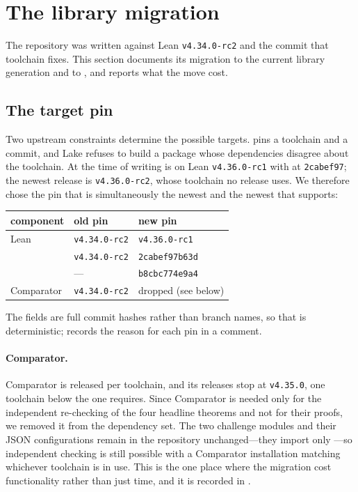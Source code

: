 \section{The library migration}
\label{sec:libraries}

The repository was written against Lean \texttt{v4.34.0-rc2} and the \Mathlib{} commit that
toolchain fixes. This section documents its migration to the current library generation and
to \TauCeti{}, and reports what the move cost.

\subsection{The target pin}
\label{sec:pin}

Two upstream constraints determine the possible targets. \TauCeti{} pins a toolchain and a
\Mathlib{} commit, and Lake refuses to build a package whose dependencies disagree about the
toolchain. At the time of writing \TauCeti{} is on Lean \texttt{v4.36.0-rc1} with \Mathlib{}
at \texttt{2cabef97}; the newest \Mathlib{} release is \texttt{v4.36.0-rc2}, whose toolchain
no \TauCeti{} release uses. We therefore chose the pin that is simultaneously the newest
\TauCeti{} and the newest \Mathlib{} that \TauCeti{} supports:
\begin{center}
\begin{tabular}{@{}lll@{}}
\toprule
component & old pin & new pin \\
\midrule
Lean & \texttt{v4.34.0-rc2} & \texttt{v4.36.0-rc1} \\
\Mathlib{} & \texttt{v4.34.0-rc2} & \texttt{2cabef97b63d} \\
\TauCeti{} & --- & \texttt{b8cbc774e9a4} \\
Comparator & \texttt{v4.34.0-rc2} & dropped (see below) \\
\bottomrule
\end{tabular}
\end{center}
The  fields are full commit hashes rather than branch names, so that
 is deterministic;  records the reason for each pin in
a comment.

\paragraph{Comparator.} Comparator is released per toolchain, and its releases stop at
\Lean{} \texttt{v4.35.0}, one toolchain below the one \TauCeti{} requires. Since Comparator is
needed only for the independent re-checking of the four headline theorems and not for their
proofs, we removed it from the dependency set. The two challenge modules and their JSON
configurations remain in the repository unchanged---they import only \Mathlib{}---so
independent checking is still possible with a Comparator installation matching whichever
toolchain is in use. This is the one place where the migration cost functionality rather
than just time, and it is recorded in .

